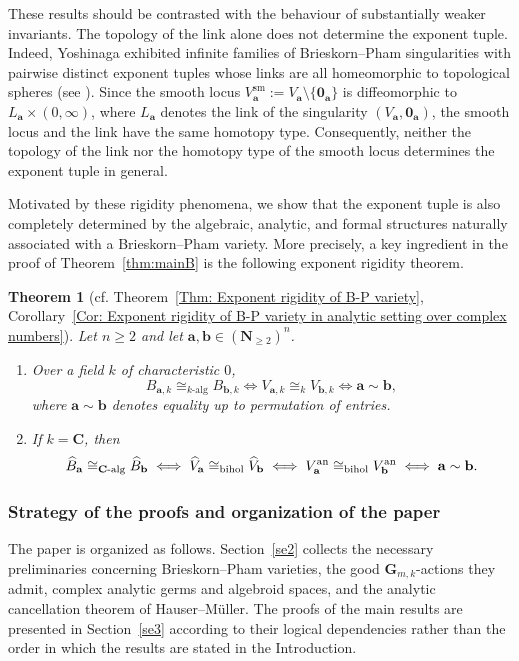 \documentclass[english,10pt,reqno,twoside]{amsart}
\numberwithin{equation}{section}
\numberwithin{figure}{section}
\theoremstyle{plain}
\theoremstyle{plain}
\theoremstyle{definition}
\theoremstyle{plain}
\newtheorem{mainthm}{Theorem}
\numberwithin{equation}{section}
\newcommand{\C}{\mathbf{C}}
\newcommand{\G}{\mathbf{G}}
\newcommand{\N}{\mathbf{N}}
\newcommand{\oo}{\mathbf{0}}
\newcommand{\ba}{\mathbf{a}}
\newcommand{\bb}{\mathbf{b}}
\begin{document}
These results should be contrasted with the behaviour of substantially weaker invariants. The topology of the link alone does not determine the exponent tuple. Indeed, Yoshinaga exhibited infinite families of Brieskorn--Pham singularities with pairwise distinct exponent tuples whose links are all homeomorphic to topological spheres (see \cite[Examples~1,~2]{Yos1983}). Since the smooth locus $V_{\ba}^{\mathrm{sm}}:=V_{\ba}\setminus \{\oo_{\ba}\}$ is diffeomorphic to $L_{\ba}\times(0,\infty)$, where $L_{\ba}$ denotes the link of the singularity $(V_{\ba},\oo_{\ba})$, the smooth locus and the link have the same homotopy type. Consequently, neither the topology of the link nor the homotopy type of the smooth locus determines the exponent tuple in general.

Motivated by these rigidity phenomena, we show that the exponent tuple is also completely determined by the algebraic, analytic, and formal structures naturally associated with a Brieskorn--Pham variety. More precisely, a key ingredient in the proof of Theorem~\ref{thm:mainB} is the following exponent rigidity theorem.

\begin{mainthm}[{cf. Theorem~\ref{Thm: Exponent rigidity of B-P variety}, Corollary~\ref{Cor: Exponent rigidity of B-P variety in analytic setting over complex numbers}}]\label{thm:mainC} Let $n\geq 2$ and let $\ba,\bb\in(\N_{\geq 2})^n$. \begin{enumerate}[\indent\rm(1)] \item Over a field $k$ of characteristic $0$, \[ B_{\ba,k} \cong_{k\text{-alg}} B_{\bb,k} \iff V_{\ba,k} \cong_k V_{\bb,k} \iff \ba\sim\bb, \] where $\ba\sim\bb$ denotes equality up to permutation of entries. \item If $k=\C$, then \[ \widehat{B}_\ba \cong_{\C\text{-alg}} \widehat{B}_\bb \iff \widehat{V}_\ba \cong_{\rm bihol} \widehat{V}_\bb \iff V_\ba^{\rm an} \cong_{\rm bihol} V_\bb^{\rm an} \iff \ba\sim\bb. \] \end{enumerate} \end{mainthm}

\subsubsection{Strategy of the proofs and organization of the paper}

The paper is organized as follows. Section~\ref{se2} collects the necessary preliminaries concerning Brieskorn--Pham varieties, the good $\G_{m,k}$-actions they admit, complex analytic germs and algebroid spaces, and the analytic cancellation theorem of Hauser--M\"uller. The proofs of the main results are presented in Section~\ref{se3} according to their logical dependencies rather than the order in which the results are stated in the Introduction.
\end{document}
